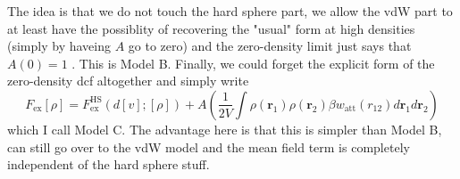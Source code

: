 \documentclass[aps,preprint]{revtex4-1}%
\begin{document}
The idea is that we do not touch the hard sphere part, we allow the vdW part
to at least have the possiblity of recovering the "usual" form at high
densities (simply by haveing $A$ go to zero) and the zero-density limit just
says that $A(0)=1$ . This is Model B. Finally, we could forget the explicit
form of the zero-density dcf altogether and simply write
\begin{equation}
F_{\text{ex}}\left[  \rho\right]  =F_{\text{ex}}^{\text{HS}}\left(  d\left[
v\right]  ;\left[  \rho\right]  \right)  +A\left(  \frac{1}{2V}\int\rho\left(
\mathbf{r}_{1}\right)  \rho\left(  \mathbf{r}_{2}\right)  \beta w_{\text{att}%
}\left(  r_{12}\right)  d\mathbf{r}_{1}d\mathbf{r}_{2}\right)
\end{equation}
which I call Model C. The advantage here is that this is simpler than Model B,
can still go over to the vdW model and the mean field term is completely
independent of the hard sphere stuff.
\end{document}

